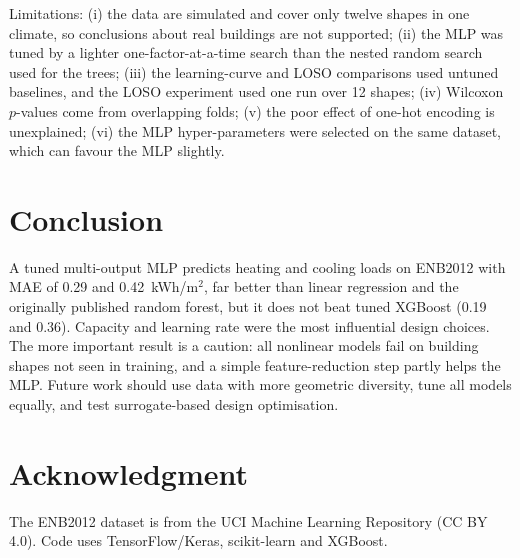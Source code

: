 \documentclass[conference]{IEEEtran}
\begin{document}
Limitations: (i) the data are simulated and cover only twelve shapes in one climate, so conclusions about real buildings are not supported; (ii) the MLP was tuned by a lighter one-factor-at-a-time search than the nested random search used for the trees; (iii) the learning-curve and LOSO comparisons used untuned baselines, and the LOSO experiment used one run over 12 shapes; (iv) Wilcoxon $p$-values come from overlapping folds; (v) the poor effect of one-hot encoding is unexplained; (vi) the MLP hyper-parameters were selected on the same dataset, which can favour the MLP slightly.

\section{Conclusion}
A tuned multi-output MLP predicts heating and cooling loads on ENB2012 with MAE of 0.29 and 0.42~kWh/m$^2$, far better than linear regression and the originally published random forest, but it does not beat tuned XGBoost (0.19 and 0.36). Capacity and learning rate were the most influential design choices. The more important result is a caution: all nonlinear models fail on building shapes not seen in training, and a simple feature-reduction step partly helps the MLP. Future work should use data with more geometric diversity, tune all models equally, and test surrogate-based design optimisation.

\section*{Acknowledgment}
The ENB2012 dataset is from the UCI Machine Learning Repository (CC BY 4.0). Code uses TensorFlow/Keras, scikit-learn and XGBoost.
\end{document}
